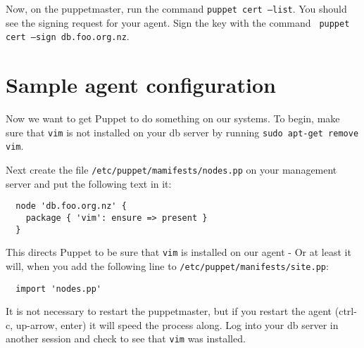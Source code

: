 \documentclass{article}
\begin{document}
Now, on the puppetmaster, run the command \texttt{puppet cert --list}.  You should see the signing request for your agent.  Sign the key with the command \texttt{ puppet cert --sign db.foo.org.nz}.

\section{Sample agent configuration}
Now we want to get Puppet to do something on our systems.  To begin, make sure that \texttt{vim} is not installed on your db server by running \texttt{sudo apt-get remove vim}.

Next create the file \texttt{/etc/puppet/mamifests/nodes.pp} on your management server and put the following text in it:
\begin{verbatim}
  node 'db.foo.org.nz' {
    package { 'vim': ensure => present }
  }
\end{verbatim}

This directs Puppet to be sure that \texttt{vim} is installed on our agent - Or at least it will, when you add the following line to \texttt{/etc/puppet/manifests/site.pp}:

\begin{verbatim}
  import 'nodes.pp'
\end{verbatim}

It is not necessary to restart the puppetmaster, but if you restart the agent (ctrl-c, up-arrow, enter) it will speed the process along.  Log into your db server in another session and check to see that \texttt{vim} was installed.
\end{document}
